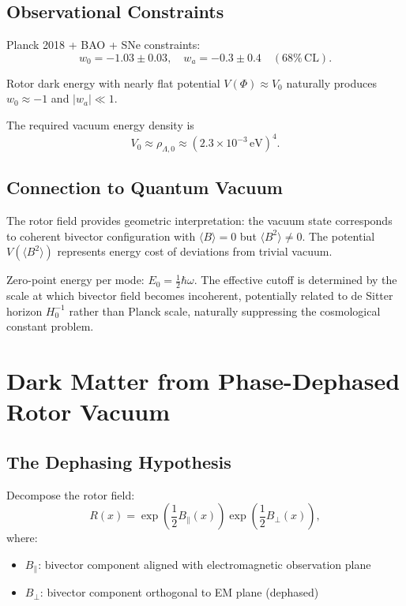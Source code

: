 \documentclass[11pt,a4paper]{article}
\numberwithin{equation}{section}
\theoremstyle{plain}
\theoremstyle{definition}
\theoremstyle{remark}
\begin{document}
\subsection{Observational Constraints}

Planck 2018 + BAO + SNe constraints:
\begin{equation}
w_0 = -1.03 \pm 0.03, \quad w_a = -0.3 \pm 0.4 \quad (68\%\,\mathrm{CL}).
\end{equation}

Rotor dark energy with nearly flat potential $V(\Phi) \approx V_0$ naturally produces $w_0 \approx -1$ and $|w_a| \ll 1$.

The required vacuum energy density is
\begin{equation}
V_0 \approx \rho_{\Lambda,0} \approx (2.3 \times 10^{-3}\,\mathrm{eV})^4.
\label{eq:vacuum-scale}
\end{equation}

\subsection{Connection to Quantum Vacuum}

The rotor field provides geometric interpretation: the vacuum state corresponds to coherent bivector configuration with $\langle B \rangle = 0$ but $\langle B^2 \rangle \neq 0$. The potential $V(\langle B^2 \rangle)$ represents energy cost of deviations from trivial vacuum.

Zero-point energy per mode: $E_0 = \frac{1}{2}\hbar\omega$. The effective cutoff is determined by the scale at which bivector field becomes incoherent, potentially related to de Sitter horizon $H_0^{-1}$ rather than Planck scale, naturally suppressing the cosmological constant problem.

\section{Dark Matter from Phase-Dephased Rotor Vacuum}
\label{sec:dark-matter}

\subsection{The Dephasing Hypothesis}

Decompose the rotor field:
\begin{equation}
R(x) = \exp\left(\frac{1}{2}B_\parallel(x)\right)\exp\left(\frac{1}{2}B_\perp(x)\right),
\label{eq:dm-decomposition}
\end{equation}
where:
\begin{itemize}
\item $B_\parallel$: bivector component aligned with electromagnetic observation plane
\item $B_\perp$: bivector component orthogonal to EM plane (dephased)
\end{itemize}
\end{document}
